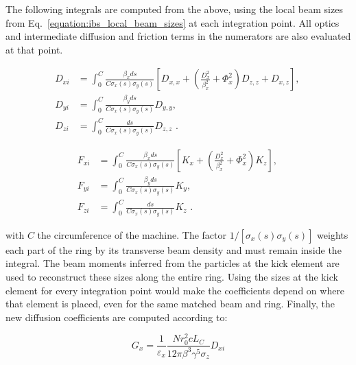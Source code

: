 The following integrals are computed from the above, using the local beam
sizes from Eq.~\eqref{equation:ibs_local_beam_sizes} at each integration point.
All optics and intermediate diffusion and friction terms in the numerators
are also evaluated at that point.

\begin{equation}
    \begin{aligned}
        D_{xi} &= \int_0^C \frac{\beta_x ds}{C \sigma_x(s) \sigma_y(s)} \left[D_{x,x} + \left(\frac{D_x^2}{\beta_x^2} + \Phi_x^2\right) D_{z,z} + D_{x,z} \right] \text{,  } \\
        D_{yi} &= \int_0^C \frac{\beta_y ds}{C \sigma_x(s) \sigma_y(s)} D_{y,y} \text{,  }  \\
        D_{zi} &= \int_0^C \frac{ds}{C \sigma_x(s) \sigma_y(s)} D_{z,z} \text{ .}
    \end{aligned}
    \label{equation:kinetic_diffusion_integrals}
\end{equation}

\begin{equation}
    \begin{aligned}
        F_{xi} &= \int_0^C \frac{\beta_x ds}{C \sigma_x(s) \sigma_y(s)} \left[K_x + \left(\frac{D_x^2}{\beta_x^2} + \Phi_x^2\right) K_z \right] \text{,  } \\
        F_{yi} &= \int_0^C \frac{\beta_y ds}{C \sigma_x(s) \sigma_y(s)} K_y \text{,  }  \\
        F_{zi} &= \int_0^C \frac{ds}{C \sigma_x(s) \sigma_y(s)} K_z \text{ .}
    \end{aligned}
    \label{equation:kinetic_friction_integrals}
\end{equation}

with \(C\) the circumference of the machine.
The factor \(1/[\sigma_x(s)\sigma_y(s)]\) weights each part of the ring by
its transverse beam density and must remain inside the integral. The beam
moments inferred from the particles at the kick element are used to
reconstruct these sizes along the entire ring. Using the sizes at the kick
element for every integration point would make the coefficients depend on
where that element is placed, even for the same matched beam and ring.
Finally, the new diffusion coefficients are computed according to:

\begin{equation}
    \boxed{G_x = \frac{1}{\varepsilon_x} \frac{N r_0^2 c L_C}{12 \pi \beta^3 \gamma^5 \sigma_z} D_{xi}}
    \label{equation:kinetic_horizontal_diffusion_coefficient}
\end{equation}

